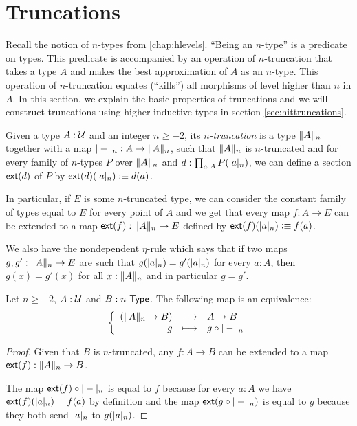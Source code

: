 \section{Truncations}
\label{sec:truncations}

Recall the notion of $n$-types from \autoref{chap:hlevels}.  ``Being
an $n$-type'' is a predicate on types.  %
This predicate is accompanied by an operation of $n$-truncation that takes a
type $A$ and makes the best approximation of $A$ as an $n$-type. This operation
of $n$-truncation equates (``kills'') all morphisms of level higher than $n$ in
$A$.  In this section, we explain the basic properties of truncations and we
will construct truncations using higher inductive types in section
\ref{sec:hittruncations}.

Given a type $A:\type$ and an integer $n\ge-2$, its \emph{$n$-truncation} is a
type $\trunc n A$ together with a map $\tprojf n:A\to\trunc nA$, such that
$\trunc n A$ is $n$-truncated and for every family of $n$-types $P$ over $\trunc
nA$ and $d:\prod_{a:A}P(\tproj na)$, we can define a section $\extend{d}$ of $P$
by $\extend{d}(\tproj na)\defeq d(a)$.

In particular, if $E$ is some $n$-truncated type, we can consider the constant
family of types equal to $E$ for every point of $A$ and we get that every map
$f:A\to{}E$ can be extended to a map $\extend{f}:\trunc nA\to{}E$ defined by
$\extend{f}(\tproj na)\defeq f(a)$.

We also have the nondependent $\eta$-rule which says that if two maps
$g,g':\trunc nA\to{}E$ are such that $g(\tproj na)=g'(\tproj na)$ for every
$a:A$, then $g(x)=g'(x)$ for all $x:\trunc nA$ and in particular $g=g'$.

\begin{lem}

  Let $n\ge-2$, $A:\type$ and $B:\typele{n}$. The following map is an
  equivalence:
  \[\function{(\trunc nA\to{}B)}{A\to{}B}{g}{g\circ\tprojf n}\]
\end{lem}

\begin{proof}
  Given that $B$ is $n$-truncated, any $f:A\to{}B$ can be extended to a map
  $\extend{f}:\trunc nA\to{}B$.

  The map $\extend{f}\circ\tprojf n$ is equal to $f$ because for every $a:A$ we
  have $\extend{f}(\tproj na)=f(a)$ by definition and the map
  $\extend{g\circ\tprojf n}$ is equal to $g$ because they both send $\tproj na$
  to $g(\tproj na)$.
\end{proof}


